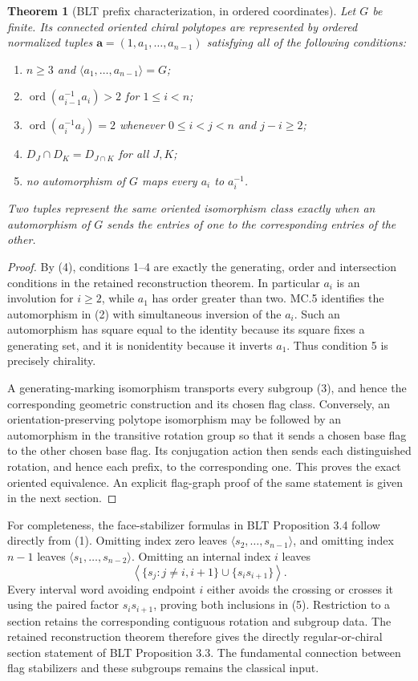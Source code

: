 \documentclass[11pt]{article}
\newtheorem{theorem}{Theorem}
\theoremstyle{remark}\newtheorem{remark}[theorem]{Remark}
\newcommand{\ord}{\operatorname{ord}}
\begin{document}
\begin{theorem}[BLT prefix characterization, in ordered coordinates]
Let $G$ be finite. Its connected oriented chiral polytopes are represented by ordered normalized tuples
$\boldsymbol a=(1,a_1,\ldots,a_{n-1})$ satisfying all of the following conditions:
\begin{enumerate}
\item $n\geq3$ and $\langle a_1,\ldots,a_{n-1}\rangle=G$;
\item $\ord(a_{i-1}^{-1}a_i)>2$ for $1\leq i<n$;
\item $\ord(a_i^{-1}a_j)=2$ whenever $0\leq i<j<n$ and $j-i\geq2$;
\item $D_J\cap D_K=D_{J\cap K}$ for all $J,K$;
\item no automorphism of $G$ maps every $a_i$ to $a_i^{-1}$.
\end{enumerate}
Two tuples represent the same oriented isomorphism class exactly when an automorphism of $G$ sends the entries of one to the corresponding entries of the other.
\end{theorem}

\begin{proof}
By (4), conditions 1--4 are exactly the generating, order and intersection conditions in the retained reconstruction theorem. In particular $a_i$ is an involution for $i\geq2$, while $a_1$ has order greater than two. MC.5 identifies the automorphism in (2) with simultaneous inversion of the $a_i$. Such an automorphism has square equal to the identity because its square fixes a generating set, and it is nonidentity because it inverts $a_1$. Thus condition 5 is precisely chirality.

A generating-marking isomorphism transports every subgroup (3), and hence the corresponding geometric construction and its chosen flag class. Conversely, an orientation-preserving polytope isomorphism may be followed by an automorphism in the transitive rotation group so that it sends a chosen base flag to the other chosen base flag. Its conjugation action then sends each distinguished rotation, and hence each prefix, to the corresponding one. This proves the exact oriented equivalence. An explicit flag-graph proof of the same statement is given in the next section.
\end{proof}

For completeness, the face-stabilizer formulas in BLT Proposition 3.4 follow directly from (1). Omitting index zero leaves
$\langle s_2,\ldots,s_{n-1}\rangle$, and omitting index $n-1$ leaves
$\langle s_1,\ldots,s_{n-2}\rangle$. Omitting an internal index $i$ leaves
\[
\left\langle\{s_j:j\ne i,i+1\}\cup\{s_is_{i+1}\}\right\rangle.
\tag{5}
\]
Every interval word avoiding endpoint $i$ either avoids the crossing or crosses it using the paired factor $s_is_{i+1}$, proving both inclusions in (5). Restriction to a section retains the corresponding contiguous rotation and subgroup data. The retained reconstruction theorem therefore gives the directly regular-or-chiral section statement of BLT Proposition 3.3. The fundamental connection between flag stabilizers and these subgroups remains the classical input.
\end{document}
